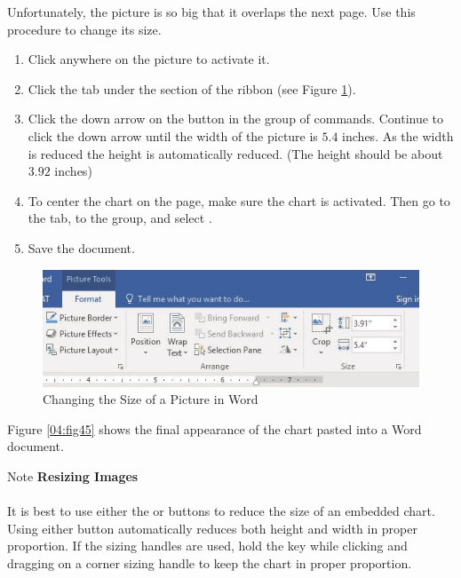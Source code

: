 Unfortunately, the picture is so big that it overlaps the next page. Use this procedure to change its size.

\begin{enumerate}
	\item Click anywhere on the picture to activate it.
	\item Click the  tab under the  section of the ribbon (see Figure \ref{04:fig44}).
	\item Click the down arrow on the  button in the  group of commands. Continue to click the down arrow until the width of the picture is $ 5.4 $ inches. As the width is reduced the height is automatically reduced. (The height should be about $ 3.92 $ inches)
	\item To center the chart on the page, make sure the chart is activated. Then go to the  tab, to the  group, and select .
	\item Save the document.
\end{enumerate}

\begin{figure}[H]
	\centering
	\includegraphics[width=\maxwidth{.95\linewidth}]{gfx/ch04_fig44}
	\caption{Changing the Size of a Picture in Word}
	\label{04:fig44}
\end{figure}

Figure \ref{04:fig45} shows the final appearance of the  chart pasted into a Word document. 

\begin{center}
	\begin{infobox}{Note}
		\textbf{Resizing Images}
		\\
		\\
		It is best to use either the  or  buttons to reduce the size of an embedded chart. Using either button automatically reduces both height and width in proper proportion. If the sizing handles are used, hold the  key while clicking and dragging on a corner sizing handle to keep the chart in proper proportion.
	\end{infobox}
\end{center}

